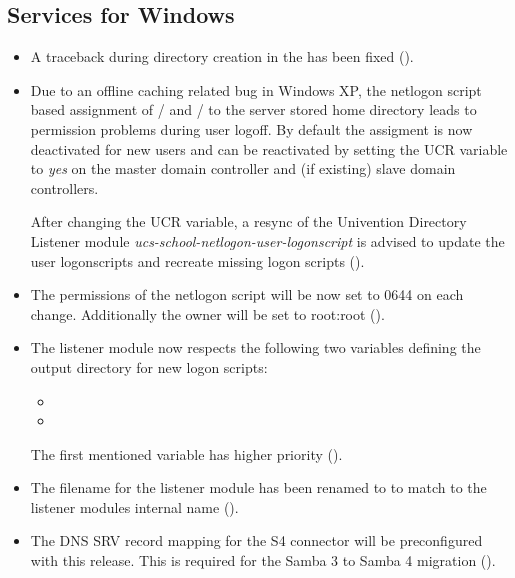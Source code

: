 \subsection{Services for Windows}
\begin{itemize}
\item A traceback during directory creation in the  
  has been fixed ().
\item Due to an offline caching related bug in Windows XP, the netlogon script based assignment of
   /  and  /  to
  the server stored home directory leads to permission problems during user logoff.
  By default the assigment is now deactivated for new users and can be reactivated by setting the
  UCR variable  to \emph{yes} on the master domain controller and (if
  existing) slave domain controllers.

  After changing the UCR variable, a resync of the Univention Directory Listener module 
  \emph{ucs-school-netlogon-user-logonscript} is advised to update the user logonscripts and recreate missing logon
  scripts ().
\item The permissions of the netlogon script  will be now set to 0644 on each
  change. Additionally the owner will be set to root:root ().
\item The listener module  now respects the following two \ucsUCR{}
  variables defining the output directory for new logon scripts:
  \begin{itemize}
  \item {}
  \item {}
  \end{itemize}
  The first mentioned variable has higher priority ().
\item The filename for the listener module  has been renamed to
   to match to the listener modules internal name ().

\item The DNS SRV record mapping for the S4 connector will be
preconfigured with this release. This is required for the Samba 3 to
Samba 4 migration ().


\end{itemize}
